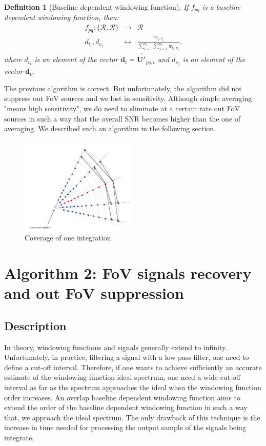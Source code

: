 \documentclass[useAMS,usenatbib]{mn2e}
\newtheorem{definition}[theorem]{Definition}
\begin{document}
\begin{definition}[Baseline dependent windowing function]
\label{def:3}
If $f_{pq}$ is a \textit{baseline dependent windowing function}, then:
\begin{eqnarray*}
 f_{pq}: \{\mathbf{\mathcal{R}},\mathbf{\mathcal{R}}\} &\rightarrow& \mathbf{\mathcal{R}}\\
                   d_{t_i},d_{\nu_j} &\mapsto& \frac{w_{t_i,\nu_j}}{\sum_{i=1}^{n_t}\sum_{j=1}^{n_{\nu}}w_{t_i,\nu_j}}.
\end{eqnarray*}
where $d_{t_i}$ is an element of the vector $\mathbf{d}_{t}=\overline{\overline{\mathbf{U}^{s}}}_{pq,t}$ and $d_{\nu_j}$ is an element 
of the vector $\mathbf{d}^{}_{\nu}$.
\end{definition}
The previous algorithm is correct. But unfortunately, the algorithm did not suppress out FoV sources and we lost  in sensitivity. 
Although simple averaging "means high sensitivity", we do need to eliminate at a certain rate out FoV sources in such a way that the 
overall SNR becomes higher than the one of averaging. We described such an algorithm in the following section.
\begin{figure}
  \centering
    \includegraphics[width=0.5\textwidth]{./Figures/uvcov.png}
    \caption{Coverage of one integration}
\end{figure}
\section{Algorithm 2: FoV signals recovery and out FoV suppression}
\label{baseline2}
\subsection{Description}
In theory, windowing functions and signals generally extend to  infinity. Unfortunately, in practice, filtering a signal with a low pass 
filter, one need to define a cut-off interval. Therefore, if one  wants to achieve sufficiently an accurate  estimate of the 
windowing function ideal spectrum, one need a wide cut-off interval as far as the spectrum approaches the ideal when the windowing function 
order increases. An overlap baseline dependent windowing function aims to extend the order of the baseline dependent windowing function in 
such a way that, we approach the ideal spectrum.
The only drawback of this technique is the increase in time needed for processing the output sample of the signals being integrate.  
\end{document}

